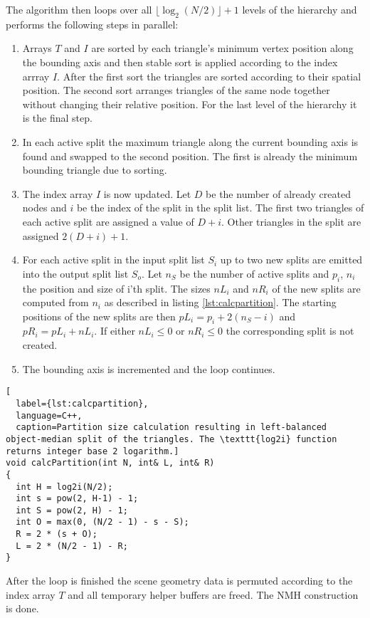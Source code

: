 The algorithm then loops over all $\lfloor \log_{2}(N/2) \rfloor + 1$ levels of the hierarchy and performs the following steps in parallel:
\begin{enumerate}
\item Arrays $T$ and $I$ are sorted by each triangle's minimum vertex position along the bounding axis and then stable sort is applied according to the index arrray $I$. After the first sort the triangles are sorted according to their spatial position. The second sort arranges triangles of the same node together without changing their relative position. For the last level of the hierarchy it is the final step.
\item In each active split the maximum triangle along the current bounding axis is found and swapped to the second position. The first is already the minimum bounding triangle due to sorting.
\item The index array $I$ is now updated. Let $D$ be the number of already created nodes and $i$ be the index of the split in the split list. The first two triangles of each active split are assigned a value of $D+i$. Other triangles in the split are assigned $2(D+i)+1$.
\item For each active split in the input split list $S_{i}$ up to two new splits are emitted into the output split list $S_{o}$. Let $n_{S}$ be the number of active splits and $p_{i}$, $n_{i}$ the position and size of i'th split. The sizes $nL_{i}$ and $nR_{i}$ of the new splits are computed from $n_{i}$ as described in listing \ref{lst:calcpartition}. The starting positions of the new splits are then $pL_{i} = p_{i} + 2(n_{S} - i)$ and $pR_{i} = pL_{i} + nL_{i}$. If either $nL_{i} \le 0$ or $nR_{i} \le 0$ the corresponding split is not created.
\item The bounding axis is incremented and the loop continues.
\end{enumerate}
\begin{lstlisting}[
  label={lst:calcpartition},
  language=C++,
  caption=Partition size calculation resulting in left-balanced object-median split of the triangles. The \texttt{log2i} function returns integer base 2 logarithm.]
void calcPartition(int N, int& L, int& R)
{
  int H = log2i(N/2);
  int s = pow(2, H-1) - 1;
  int S = pow(2, H) - 1;
  int O = max(0, (N/2 - 1) - s - S);
  R = 2 * (s + O);
  L = 2 * (N/2 - 1) - R;
}
\end{lstlisting}
After the loop is finished the scene geometry data is permuted according to the index array $T$ and all temporary helper buffers are freed. The NMH construction is done.

